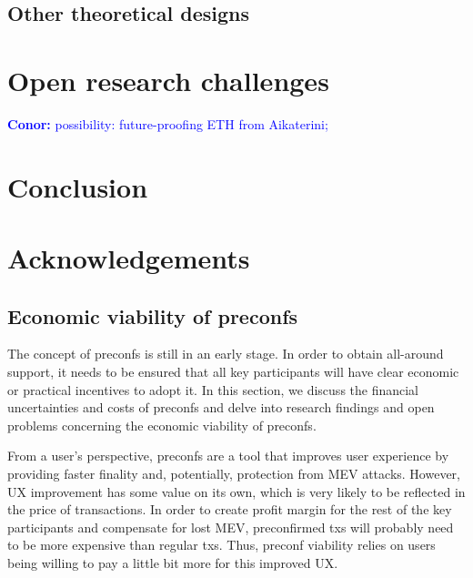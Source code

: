 \documentclass[a4paper]{article}
\theoremstyle{boldstyle}
\newcommand{\cm}[1]{\textcolor{blue}{\textbf{Conor:} #1}}
\begin{document}
                

\subsection{Other theoretical designs}

\section{Open research challenges} %
\cm{possibility: future-proofing ETH from Aikaterini;}


\section{Conclusion}

\section*{Acknowledgements}




\newpage

% 


% 

\appendix
\subsection{Economic viability of preconfs} 
    The concept of preconfs is still in an early stage. In order to obtain all-around support, it needs to be ensured that all key participants will have clear economic or practical incentives to adopt it. In this section, we discuss the financial uncertainties and costs of preconfs and delve into research findings and open problems concerning the economic viability of preconfs. 
    
    From a user's perspective, preconfs are a tool that improves user experience by providing faster finality and, potentially, protection from MEV attacks. However, UX improvement has some value on its own, which is very likely to be reflected in the price of transactions. In order to create profit margin for the rest of the key participants and compensate for lost MEV, preconfirmed txs will probably need to be more expensive than regular txs. Thus, preconf viability relies on users being willing to pay a little bit more for this improved UX. 
\end{document}
